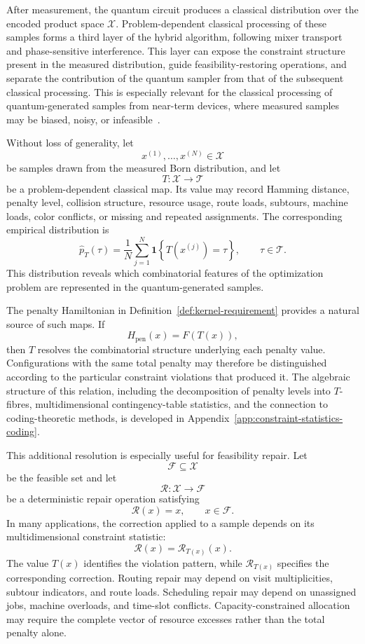 \documentclass[a4paper,onecolumn,11pt,unpublished]{quantumarticle}
\theoremstyle{remark}
\begin{document}
After measurement, the quantum circuit produces a classical distribution over
the encoded product space \(\mathcal X\). Problem-dependent classical processing of
these samples forms a third layer of the hybrid algorithm, following mixer
transport and phase-sensitive interference. This layer can expose the
constraint structure present in the measured distribution, guide
feasibility-restoring operations, and separate the contribution of the
quantum sampler from that of the subsequent classical processing. %
This is especially relevant for the classical processing of quantum-generated samples from near-term devices, where measured samples may be biased, noisy, or infeasible~\cite{Maciejewski_2025,hadfield2026ndar,Maciejewski2026}.

Without loss of generality, let
\[
x^{(1)},\ldots,x^{(N)}\in \mathcal X
\]
be samples drawn from the measured Born distribution, and let
\[
T:\mathcal X\longrightarrow\mathcal T
\]
be a problem-dependent classical map. Its value may record Hamming distance, penalty level, collision structure, resource usage, route loads, subtours,
machine loads, color conflicts, or missing and repeated assignments. The
corresponding empirical distribution is
\[
\widehat p_T(\tau)
=
\frac{1}{N}
\sum_{j=1}^{N}
\mathbf 1\!\left\{T\!\left(x^{(j)}\right)=\tau\right\},
\qquad
\tau\in\mathcal T.
\]
This distribution reveals which combinatorial features of the optimization
problem are represented in the quantum-generated samples.

The penalty Hamiltonian in
Definition~\ref{def:kernel-requirement} provides a natural source of such maps. If
\begin{equation}
H_{\mathrm{pen}}(x)=F(T(x)),
\label{eq:scheme-alignment-present}
\end{equation}
then \(T\) resolves the combinatorial structure underlying each penalty
value. Configurations with the same total penalty may therefore be
distinguished according to the particular constraint violations that produced
it. The algebraic structure of this relation, including the decomposition of
penalty levels into \(T\)-fibres, multidimensional contingency-table
statistics, and the connection to coding-theoretic methods, is developed in
Appendix~\ref{app:constraint-statistics-coding}.

This additional resolution is especially useful for feasibility repair. Let
\[
\mathcal F\subseteq \mathcal X
\]
be the feasible set and let
\[
\mathcal R:\mathcal X\longrightarrow\mathcal F
\]
be a deterministic repair operation satisfying
\[
\mathcal R(x)=x,
\qquad x\in\mathcal F.
\]
In many applications, the correction applied to a sample depends on its
multidimensional constraint statistic:
\[
\mathcal R(x)=\mathcal R_{T(x)}(x).
\]
The value \(T(x)\) identifies the violation pattern, while
\(\mathcal R_{T(x)}\) specifies the corresponding correction. Routing repair
may depend on visit multiplicities, subtour indicators, and route loads.
Scheduling repair may depend on unassigned jobs, machine overloads, and
time-slot conflicts. Capacity-constrained allocation may require the complete
vector of resource excesses rather than the total penalty alone.
\end{document}
